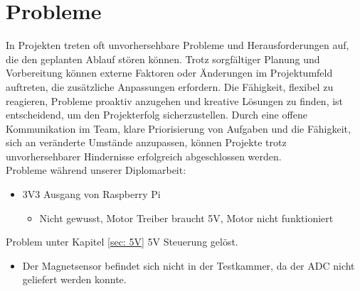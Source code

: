 \section{Probleme}
In Projekten treten oft unvorhersehbare Probleme und Herausforderungen auf, die den geplanten Ablauf stören können. Trotz sorgfältiger Planung und Vorbereitung können externe Faktoren oder Änderungen im Projektumfeld auftreten, die zusätzliche Anpassungen erfordern. Die Fähigkeit, flexibel zu reagieren, Probleme proaktiv anzugehen und kreative Lösungen zu finden, ist entscheidend, um den Projekterfolg sicherzustellen. Durch eine offene Kommunikation im Team, klare Priorisierung von Aufgaben und die Fähigkeit, sich an veränderte Umstände anzupassen, können Projekte trotz unvorhersehbarer Hindernisse erfolgreich abgeschlossen werden.\\
\vspace{5mm}
Probleme während unserer Diplomarbeit:\\
\vspace{5mm}
\begin{itemize}
    \item 3V3 Ausgang von Raspberry Pi 
    \begin{itemize}
        \item Nicht gewusst, Motor Treiber braucht 5V, Motor nicht funktioniert
    \end{itemize}
\end{itemize}
\vspace{5mm}
Problem unter Kapitel \ref{sec: 5V} 5V Steuerung gelöst.
\vspace{5mm}
\begin{itemize}
    \item Der Magnetsensor befindet sich nicht in der Testkammer, da der ADC nicht geliefert werden konnte.
\end{itemize}